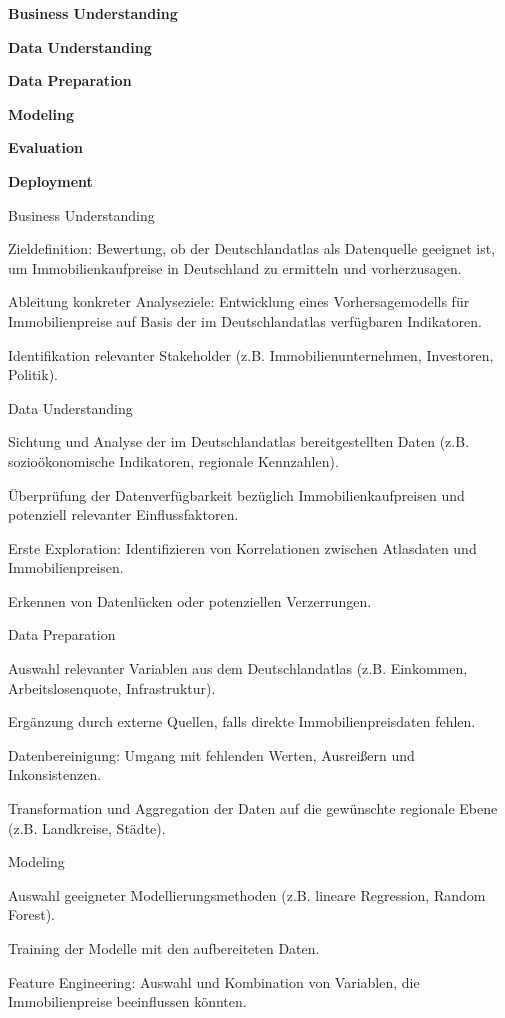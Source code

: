\textbf{Business Understanding}

\textbf{Data Understanding}

\textbf{Data Preparation}

\textbf{Modeling}

\textbf{Evaluation}

\textbf{Deployment}





Business Understanding

    Zieldefinition: Bewertung, ob der Deutschlandatlas als Datenquelle geeignet ist, um Immobilienkaufpreise in Deutschland zu ermitteln und vorherzusagen.

    Ableitung konkreter Analyseziele: Entwicklung eines Vorhersagemodells für Immobilienpreise auf Basis der im Deutschlandatlas verfügbaren Indikatoren.

    Identifikation relevanter Stakeholder (z.B. Immobilienunternehmen, Investoren, Politik).

Data Understanding

    Sichtung und Analyse der im Deutschlandatlas bereitgestellten Daten (z.B. sozioökonomische Indikatoren, regionale Kennzahlen).

    Überprüfung der Datenverfügbarkeit bezüglich Immobilienkaufpreisen und potenziell relevanter Einflussfaktoren.

    Erste Exploration: Identifizieren von Korrelationen zwischen Atlasdaten und Immobilienpreisen.

    Erkennen von Datenlücken oder potenziellen Verzerrungen.

Data Preparation

    Auswahl relevanter Variablen aus dem Deutschlandatlas (z.B. Einkommen, Arbeitslosenquote, Infrastruktur).

    Ergänzung durch externe Quellen, falls direkte Immobilienpreisdaten fehlen.

    Datenbereinigung: Umgang mit fehlenden Werten, Ausreißern und Inkonsistenzen.

    Transformation und Aggregation der Daten auf die gewünschte regionale Ebene (z.B. Landkreise, Städte).

Modeling

    Auswahl geeigneter Modellierungsmethoden (z.B. lineare Regression, Random Forest).

    Training der Modelle mit den aufbereiteten Daten.

    Feature Engineering: Auswahl und Kombination von Variablen, die Immobilienpreise beeinflussen könnten.


